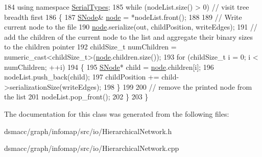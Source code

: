 \begin{DoxyCode}
184     \textcolor{keyword}{using namespace }\mbox{\hyperlink{namespaceSerialTypes}{SerialTypes}};
185     \textcolor{keywordflow}{while} (nodeList.size() > 0) \textcolor{comment}{// visit tree breadth first}
186     \{
187         \mbox{\hyperlink{classSNode}{SNode}}& \mbox{\hyperlink{structnode}{node}} = *nodeList.front();
188 
189         \textcolor{comment}{// Write current node to the file}
190         \mbox{\hyperlink{structnode}{node}}.serialize(out, childPosition, writeEdges);
191         \textcolor{comment}{// add the children of the current node to the list and aggregate their binary sizes to the
       children pointer}
192         childSize\_t numChildren = numeric\_cast<childSize\_t>(\mbox{\hyperlink{structnode}{node}}.children.size());
193         \textcolor{keywordflow}{for} (childSize\_t i = 0; i < numChildren; ++i)
194         \{
195             \mbox{\hyperlink{classSNode}{SNode}}* child = \mbox{\hyperlink{structnode}{node}}.children[i];
196             nodeList.push\_back(child);
197             childPosition += child->serializationSize(writeEdges);
198         \}
199 
200         \textcolor{comment}{// remove the printed node from the list}
201         nodeList.pop\_front();
202     \}
203 \}
\end{DoxyCode}


The documentation for this class was generated from the following files\+:\begin{DoxyCompactItemize}
\item 
dsmacc/graph/infomap/src/io/Hierarchical\+Network.\+h\item 
dsmacc/graph/infomap/src/io/Hierarchical\+Network.\+cpp\end{DoxyCompactItemize}
